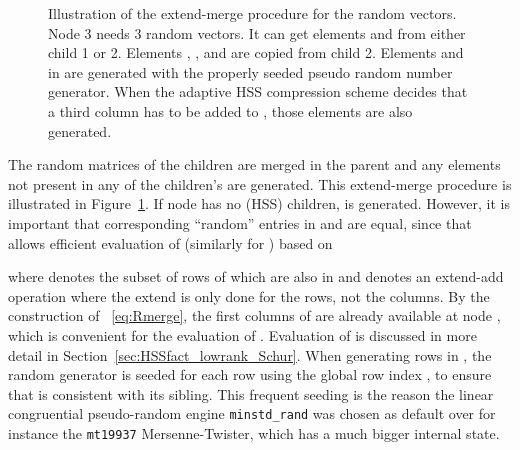\documentclass{article}
\begin{document}
\begin{figure}
\begin{subfigure}{.34\textwidth}
    \begin{center}
    \end{center}
  \end{subfigure}
  \begin{subfigure}{.64\textwidth}
    \begin{center}
         
    \end{center}
  \end{subfigure}
  \caption{\footnotesize Illustration of the extend-merge procedure for the
    random vectors. Node 3 needs 3 random vectors. It can get elements
     and  from either child 1 or 2. Elements
    , ,  and  are copied from
    child 2. Elements  and  in  are generated
    with the properly seeded pseudo random number generator. When the
    adaptive HSS compression scheme decides that a third column has to
    be added to , those elements are also generated. }
  \label{fig:extend-add}
\end{figure}
The random matrices of the children are merged in the parent  and
any elements not present in any of the children's  are
generated. This extend-merge procedure is illustrated in
Figure~\ref{fig:extend-add}. If node  has no (HSS) children, 
is generated. However, it is important that corresponding ``random''
entries in  and  are equal, since that allows
efficient evaluation of  (similarly for
) based on

where  denotes the subset of rows of
 which are also in  and 
denotes an extend-add operation where the extend is only done for the
rows, not the columns. By the construction of ~\eqref{eq:Rmerge},
the first  columns of  are
already available at node , which is convenient for the
evaluation of .
Evaluation of  is
discussed in more detail in
Section~\ref{sec:HSSfact_lowrank_Schur}. When generating rows in
, the random generator is seeded for each row using the global
row index , to ensure that  is consistent with its
sibling. This frequent seeding is the reason the linear congruential
pseudo-random engine \verb+minstd_rand+ was chosen as default over for
instance the \verb+mt19937+ Mersenne-Twister, which has a much bigger
internal state.
\end{document}
